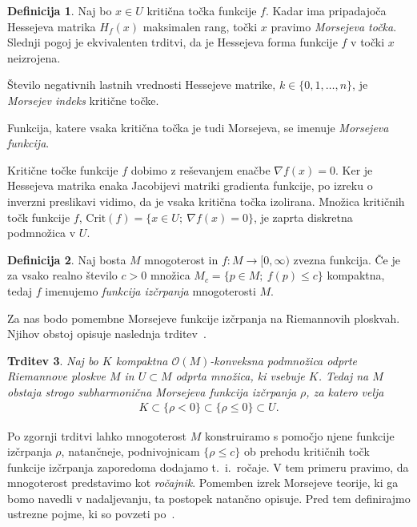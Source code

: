 \documentclass[12pt,a4paper,twoside]{article}
\theoremstyle{definition} %
\newtheorem{definicija}{Definicija}[section]
\theoremstyle{plain} %
\newtheorem{trditev}[definicija]{Trditev}
\numberwithin{equation}{section}  %
\begin{document}
\begin{definicija}
Naj bo $x \in U$ kritična točka funkcije $f$. Kadar ima pripadajoča Hessejeva matrika $H_{f}(x)$ maksimalen rang, točki $x$ pravimo \emph{Morsejeva točka}. Slednji pogoj je ekvivalenten trditvi, da je Hessejeva forma funkcije $f$ v točki $x$ neizrojena.

Število negativnih lastnih vrednosti Hessejeve matrike, $k \in \{0,1, \dots , n\}$, je \emph{Morsejev indeks} kritične točke.

Funkcija, katere vsaka kritična točka je tudi Morsejeva, se imenuje \emph{Morsejeva funkcija}.
\end{definicija}

Kritične točke funkcije $f$ dobimo z reševanjem enačbe $\nabla f(x)=0$. Ker je Hessejeva matrika enaka Jacobijevi matriki gradienta funkcije, po izreku o inverzni preslikavi vidimo, da je vsaka kritična točka izolirana. Množica kritičnih točk funkcije $f$, $\text{Crit}(f) = \{ x \in U; \ \nabla f(x)=0 \}$, je zaprta diskretna podmnožica v $U$.

\begin{definicija}
Naj bosta $M$ mnogoterost in $f \colon M \to [0, \infty)$ zvezna funkcija. Če je za vsako realno število $c>0$ množica $M_{c} = \{ p \in M; \ f(p) \leq c \}$ kompaktna, tedaj $f$ imenujemo \emph{funkcija izčrpanja} mnogoterosti $M$.
\end{definicija}

Za nas bodo pomembne Morsejeve funkcije izčrpanja na Riemannovih ploskvah. Njihov obstoj opisuje naslednja trditev~\cite[Proposition~1.12.5]{alarcon2021minimal}.

\begin{trditev} \label{trd:Riem-ploskev-Morse-izcrpanje}
Naj bo $K$ kompaktna $\mathcal{O}(M)$-konveksna podmnožica odprte Riemannove ploskve $M$ in $U \subset M$ odprta množica, ki vsebuje $K$.
Tedaj na $M$ obstaja strogo subharmonična Morsejeva funkcija izčrpanja $\rho$, za katero velja 
\begin{gather*}
K \subset \{ \rho<0 \} \subset \{ \rho \leq 0 \} \subset U.
\end{gather*}
\end{trditev}

Po zgornji trditvi lahko mnogoterost $M$ konstruiramo s pomočjo njene funkcije izčrpanja $\rho$, natančneje, podnivojnicam $\{ \rho \leq c \}$ ob prehodu kritičnih točk funkcije izčrpanja zaporedoma dodajamo t.~i.~ročaje. V tem primeru pravimo, da mnogoterost predstavimo kot \emph{ročajnik}. Pomemben izrek Morsejeve teorije, ki ga bomo navedli v nadaljevanju, ta postopek natančno opisuje. Pred tem definirajmo ustrezne pojme, ki so povzeti po~\cite[Section~1.4]{alarcon2021minimal}.
\end{document}

